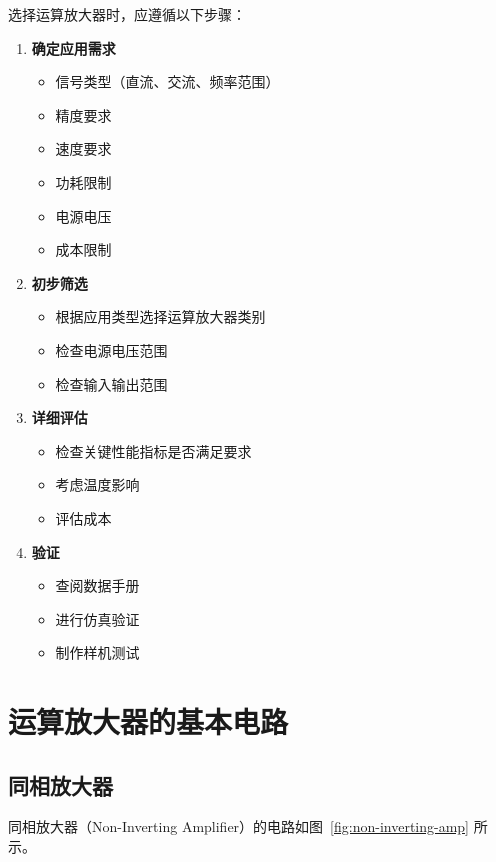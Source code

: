 选择运算放大器时，应遵循以下步骤：

\begin{enumerate}
  \item \textbf{确定应用需求}
    \begin{itemize}
      \item 信号类型（直流、交流、频率范围）
      \item 精度要求
      \item 速度要求
      \item 功耗限制
      \item 电源电压
      \item 成本限制
    \end{itemize}

  \item \textbf{初步筛选}
    \begin{itemize}
      \item 根据应用类型选择运算放大器类别
      \item 检查电源电压范围
      \item 检查输入输出范围
    \end{itemize}

  \item \textbf{详细评估}
    \begin{itemize}
      \item 检查关键性能指标是否满足要求
      \item 考虑温度影响
      \item 评估成本
    \end{itemize}

  \item \textbf{验证}
    \begin{itemize}
      \item 查阅数据手册
      \item 进行仿真验证
      \item 制作样机测试
    \end{itemize}
\end{enumerate}

\section{运算放大器的基本电路}

\subsection{同相放大器}

同相放大器（Non-Inverting Amplifier）的电路如图~\ref{fig:non-inverting-amp} 所示。

